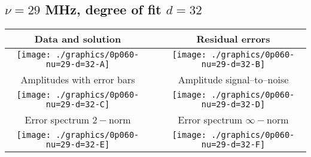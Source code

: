 

% 

\clearpage{}
\break{}

\subsection{$\nu = 29$ MHz, degree of fit $d = 32$}

\begin{table}[h]
    \begin{center}
        \begin{tabular}{ccc}
            Data and solution & \quad & Residual errors \\\hline
            \texttt{[image: ./graphics/0p060-nu=29-d=32-A]} &&
            \texttt{[image: ./graphics/0p060-nu=29-d=32-B]} \\[15pt]
            Amplitudes with error bars && Amplitude signal--to--noise \\\hline
            \texttt{[image: ./graphics/0p060-nu=29-d=32-C]} &&
            \texttt{[image: ./graphics/0p060-nu=29-d=32-D]} \\[15pt]
            Error spectrum $2-$norm && Error spectrum $\infty-$norm \\\hline
            \texttt{[image: ./graphics/0p060-nu=29-d=32-E]} &&
            \texttt{[image: ./graphics/0p060-nu=29-d=32-F]} \\[15pt]
        \end{tabular}
    \end{center}
\label{fig:elev=60, nu=29}
\end{table}



\endinput
